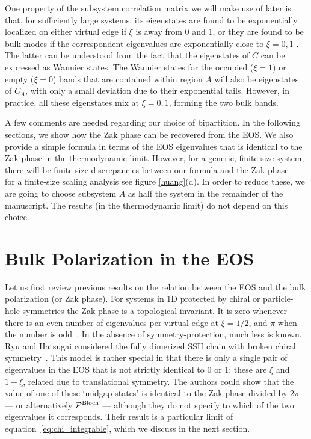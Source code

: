 \documentclass[twocolumn,amsmath,longbibliography,amssymb,superscriptaddress]{revtex4-1}
\begin{document}
One property of the subsystem correlation matrix we will make use of later is that, for sufficiently large systems, its eigenstates are found to be exponentially localized on either virtual edge if $\xi$ is away from $0$ and $1$, or they are found to be bulk modes if the correspondent eigenvalues are exponentially close to $\xi = 0,1$ \cite{Peschel2008}. The latter can be understood from the fact that the eigenstates of $C$ can be expressed as Wannier states. The Wannier states for the occupied ($\xi=1$) or empty ($\xi=0$) bands that are contained within region $A$ will also be eigenstates of $C_A$, with only a small deviation due to their exponential tails. However, in practice, all these eigenstates mix at $\xi=0,1$, forming the two bulk bands. 

A few comments are needed regarding our choice of  bipartition. 
In the following sections, we show how the Zak phase can be recovered from the EOS.
We also provide a simple formula in terms of the EOS eigenvalues that is identical to the Zak phase in the thermodynamic limit.  
However, for a generic, finite-size system, there will be finite-size discrepancies between our formula and the Zak phase --- for a finite-size scaling analysis see figure \ref{huang}(d). 
In order to reduce these, we are going to choose subsystem $A$ as half the system in the remainder of the manuscript.
The results (in the thermodynamic limit) do not depend on this choice. 
\section{Bulk Polarization in the EOS}\label{sec:bulkpolarization}

Let us first review previous results on the relation between the EOS and the bulk polarization (or Zak phase). 
For systems in 1D protected by chiral or particle-hole symmetries the Zak phase is a topological invariant. It is zero whenever there is an even number  of eigenvalues per virtual edge at $\xi = 1/2$, and $\pi$ when the number is odd~\cite{Asboth2016}. 
In the absence of symmetry-protection, much less is known. 
Ryu and Hatsugai considered the fully dimerized SSH chain with broken chiral symmetry~\cite{Ryu2006}.  
This model is rather special in that there is only a single pair of eigenvalues in the EOS that is not strictly identical to $0$ or $1$: these are $\xi$ and $1-\xi$, related due to translational symmetry. 
The authors could show that the value of one of these `midgap states' is identical to the Zak phase divided by $2\pi$ --- or alternatively $\tilde{\mathcal{P}}^{\rm Bloch}$ --- although they do not specify to which of the two eigenvalues it corresponds. 
Their result is a particular limit of equation~\eqref{eq:chi_integrable}, which we discuss in the next section. 
\end{document}
